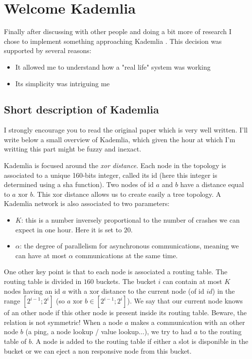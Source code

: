 \documentclass[a4paper]{article}
\begin{document}
\section{Welcome Kademlia}

Finally after discussing with other people and doing a bit more of research I chose to implement something approaching Kademlia \cite{maymounkov2002kademlia}. This decision was supported by several reasons:
\begin{itemize}
    \item It allowed me to understand how a "real life" system was working
    \item Its simplicity was intriguing me
\end{itemize}

\subsection{Short description of Kademlia}

I strongly encourage you to read the original paper which is very well written. I'll write below a small overview of Kademlia, which given the hour at which I'm writting this part might be fuzzy and inexact.

Kademlia is focused around the \textit{xor distance}. Each node in the topology is associated to a unique 160-bits integer, called its id (here this integer is determined using a sha function). Two nodes of id $a$ and $b$ have a distance equal to $a \text{ xor } b$. This xor distance allows us to create easily a tree topology.
A Kademlia network is also associated to two parameters:
\begin{itemize}
    \item $K$: this is a number inversely proportional to the number of crashes we can expect in one hour. Here it is set to $20$.
    \item $\alpha$: the degree of parallelism for asynchronous communications, meaning we can have at most $\alpha$ communications at the same time.
\end{itemize}

One other key point is that to each node is associated a routing table. The routing table is divided in $160$ buckets. The bucket $i$ can contain at most $K$ nodes having an id $a$ with a xor distance to the current node (of id $id$) in the range $[2^{i-1}; 2^{i}]$ (so $a \text{ xor } b \in [2^{i-1}; 2^{i}]$). We say that our current node knows of an other node if this other node is present inside its routing table. Beware, the relation is not symmetric! When a node $a$ makes a communication with an other node $b$ (a ping, a node lookup / value lookup...), we try to had $a$ to the routing table of $b$. A node is added to the routing table if either a slot is disponible in the bucket or we can eject a non responsive node from this bucket. 
\end{document}
